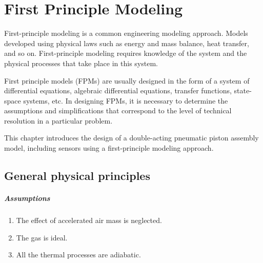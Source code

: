 %                            

\chapter{First Principle Modeling}
First-principle modeling is a common engineering modeling approach. Models
developed using physical laws such as energy and mass balance, heat
transfer, and so on. First-principle modeling requires knowledge of the
system and the physical processes that take place in this system.

First principle models (FPMs) are usually designed in the form of a system
of differential equations, algebraic differential equations, transfer
functions, state-space systems, etc.  In designing FPMs, it is necessary to
determine the assumptions and simplifications that correspond to the level
of technical resolution in a particular problem.

This chapter introduces the design of a double-acting pneumatic piston
assembly model, including sensors using a first-principle modeling
approach. 



\section{General physical principles}
\paragraph{Assumptions}\label{assumptions}

\begin{enumerate}
    \item The effect of accelerated air mass is neglected. 
    \item The gas is ideal. 
    \item All the thermal processes are adiabatic.
\end{enumerate}


